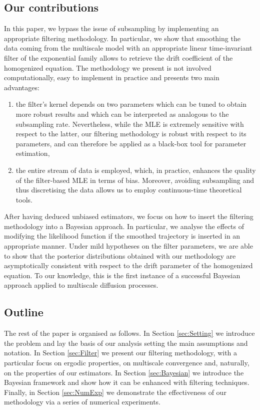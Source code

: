\documentclass[10pt]{article}
\begin{document}
\subsection{Our contributions}
In this paper, we bypass the issue of subsampling by implementing an appropriate filtering methodology. In particular, we show that smoothing the data coming from the multiscale model with an appropriate linear time-invariant filter of the exponential family allows to retrieve the drift coefficient of the homogenized equation. The methodology we present is not involved computationally, easy to implement in practice and presents two main advantages:
\begin{enumerate}
	\item the filter's kernel depends on two parameters which can be tuned to obtain more robust results and which can be interpreted as analogous to the subsampling rate. Nevertheless, while the MLE is extremely sensitive with respect to the latter, our filtering methodology is robust with respect to its parameters, and can therefore be applied as a black-box tool for parameter estimation,
	\item the entire stream of data is employed, which, in practice, enhances the quality of the filter-based MLE in terms of bias. Moreover, avoiding subsampling and thus discretising the data allows us to employ continuous-time theoretical tools.
\end{enumerate}
After having deduced unbiased estimators, we focus on how to insert the filtering methodology into a Bayesian approach. In particular, we analyse the effects of modifying the likelihood function if the smoothed trajectory is inserted in an appropriate manner. Under mild hypotheses on the filter parameters, we are able to show that the posterior distributions obtained with our methodology are asymptotically consistent with respect to the drift parameter of the homogenized equation. To our knowledge, this is the first instance of a successful Bayesian approach applied to multiscale diffusion processes.

\subsection{Outline}
The rest of the paper is organised as follows. In Section \ref{sec:Setting} we introduce the problem and lay the basis of our analysis setting the main assumptions and notation. In Section \ref{sec:Filter} we present our filtering methodology, with a particular focus on ergodic properties, on multiscale convergence and, naturally, on the properties of our estimators. In Section \ref{sec:Bayesian} we introduce the Bayesian framework and show how it can be enhanced with filtering techniques. Finally, in Section \ref{sec:NumExp} we demonstrate the effectiveness of our methodology via a series of numerical experiments.
\end{document}
